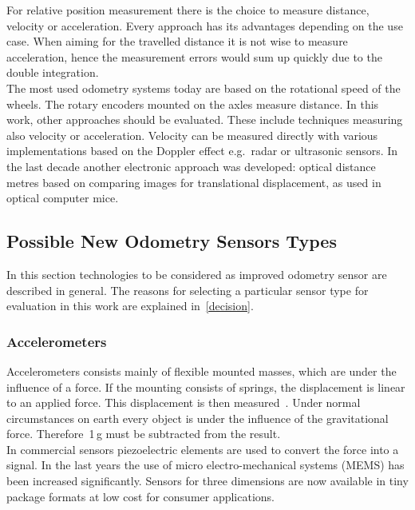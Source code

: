\documentclass[12pt,a4paper]{article}
\begin{document}
For relative position measurement there is the choice to measure distance, velocity or acceleration.
Every approach has its advantages depending on the use case.
When aiming for the travelled distance it is not wise to measure acceleration, hence the measurement errors would sum up quickly due to the double integration.\\
The most used odometry systems today are based on the rotational speed of the wheels.
The rotary encoders mounted on the axles measure distance.
In this work, other approaches should be evaluated. 
These include techniques measuring also velocity or acceleration.
Velocity can be measured directly with various implementations based on the Doppler effect e.g.\ radar or ultrasonic sensors.
In the last decade another electronic approach was developed: optical distance metres based on comparing images for translational displacement, as used in optical computer mice.

\subsection{Possible New Odometry Sensors Types}

In this section technologies to be considered as improved odometry sensor are described in general.
The reasons for selecting a particular sensor type for evaluation in this work are explained in~\autoref{decision}.


\subsubsection{Accelerometers}

Accelerometers consists mainly of flexible mounted masses, which are under the influence of a force.
If the mounting consists of springs, the displacement is linear to an applied force.
This displacement is then measured~\cite{pmt}.
Under normal circumstances on earth every object is under the influence of the gravitational force.
Therefore~1\,g must be subtracted from the result.\\
In commercial sensors piezoelectric elements are used to convert the force into a signal.
In the last years the use of micro electro-mechanical systems (MEMS) has been increased significantly.
Sensors for three dimensions are now available in tiny package formats at low cost for consumer applications.
\end{document}
